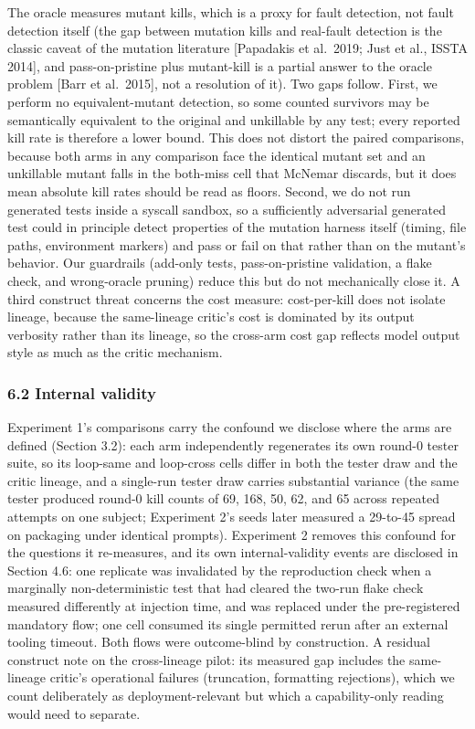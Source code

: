 \documentclass[
  11pt,
]{article}
\begin{document}
The oracle measures mutant kills, which is a proxy for fault detection,
not fault detection itself (the gap between mutation kills and
real-fault detection is the classic caveat of the mutation literature
{[}Papadakis et al.~2019; Just et al., ISSTA 2014{]}, and
pass-on-pristine plus mutant-kill is a partial answer to the oracle
problem {[}Barr et al.~2015{]}, not a resolution of it). Two gaps
follow. First, we perform no equivalent-mutant detection, so some
counted survivors may be semantically equivalent to the original and
unkillable by any test; every reported kill rate is therefore a lower
bound. This does not distort the paired comparisons, because both arms
in any comparison face the identical mutant set and an unkillable mutant
falls in the both-miss cell that McNemar discards, but it does mean
absolute kill rates should be read as floors. Second, we do not run
generated tests inside a syscall sandbox, so a sufficiently adversarial
generated test could in principle detect properties of the mutation
harness itself (timing, file paths, environment markers) and pass or
fail on that rather than on the mutant's behavior. Our guardrails
(add-only tests, pass-on-pristine validation, a flake check, and
wrong-oracle pruning) reduce this but do not mechanically close it. A
third construct threat concerns the cost measure: cost-per-kill does not
isolate lineage, because the same-lineage critic's cost is dominated by
its output verbosity rather than its lineage, so the cross-arm cost gap
reflects model output style as much as the critic mechanism.

\subsubsection{6.2 Internal validity}\label{internal-validity}

Experiment 1's comparisons carry the confound we disclose where the arms
are defined (Section 3.2): each arm independently regenerates its own
round-0 tester suite, so its loop-same and loop-cross cells differ in
both the tester draw and the critic lineage, and a single-run tester
draw carries substantial variance (the same tester produced round-0 kill
counts of 69, 168, 50, 62, and 65 across repeated attempts on one
subject; Experiment 2's seeds later measured a 29-to-45 spread on
packaging under identical prompts). Experiment 2 removes this confound
for the questions it re-measures, and its own internal-validity events
are disclosed in Section 4.6: one replicate was invalidated by the
reproduction check when a marginally non-deterministic test that had
cleared the two-run flake check measured differently at injection time,
and was replaced under the pre-registered mandatory flow; one cell
consumed its single permitted rerun after an external tooling timeout.
Both flows were outcome-blind by construction. A residual construct note
on the cross-lineage pilot: its measured gap includes the same-lineage
critic's operational failures (truncation, formatting rejections), which
we count deliberately as deployment-relevant but which a capability-only
reading would need to separate.
\end{document}
